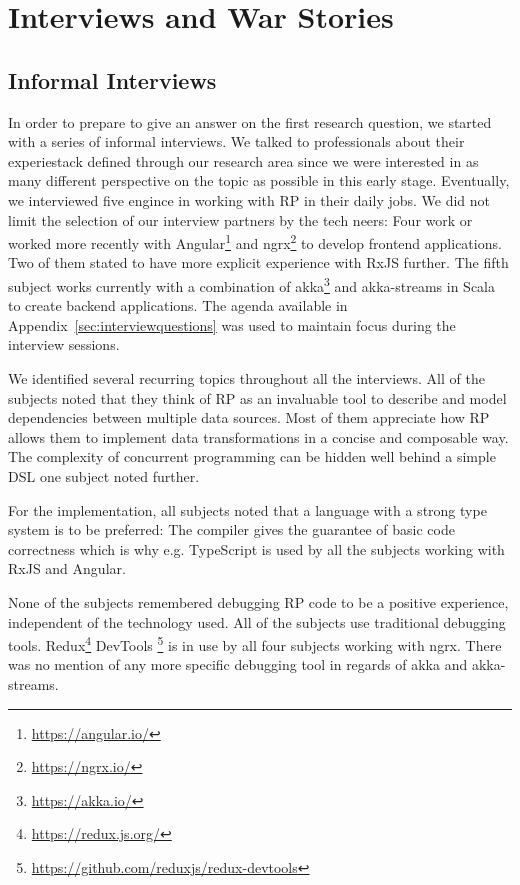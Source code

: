 \documentclass[12pt,a4paper]{article}
\begin{document}
\section{Interviews and War Stories}
\label{sec:interviews}

\subsection{Informal Interviews}

In order to prepare to give an answer on the first research question, we started with a series of informal interviews. We talked to professionals about their experiestack defined through our research area since we were interested in as many different perspective on the topic as possible in this early stage. Eventually, we interviewed five engince in working with RP in their daily jobs. We did not limit the selection of our interview partners by the tech neers: Four work or worked more recently with Angular\footnote{\url{https://angular.io/}} and ngrx\footnote{\url{https://ngrx.io/}} to develop frontend applications. Two of them stated to have more explicit experience with RxJS further. The fifth subject works currently with a combination of akka\footnote{\url{https://akka.io/}} and akka-streams in Scala to create backend applications. The agenda available in Appendix~\ref{sec:interviewquestions} was used to maintain focus during the interview sessions.

We identified several recurring topics throughout all the interviews. All of the subjects noted that they think of RP as an invaluable tool to describe and model dependencies between multiple data sources. Most of them appreciate how RP allows them to implement data transformations in a concise and composable way. The complexity of concurrent programming can be hidden well behind a simple DSL one subject noted further.

For the implementation, all subjects noted that a language with a strong type system is to be preferred: The compiler gives the guarantee of basic code correctness which is why e.g. TypeScript is used by all the subjects working with RxJS and Angular.

None of the subjects remembered debugging RP code to be a positive experience, independent of the technology used. All of the subjects use traditional debugging tools. Redux\footnote{\url{https://redux.js.org/}} DevTools \footnote{\url{https://github.com/reduxjs/redux-devtools}} is in use by all four subjects working with ngrx. There was no mention of any more specific debugging tool in regards of akka and akka-streams.
\end{document}
